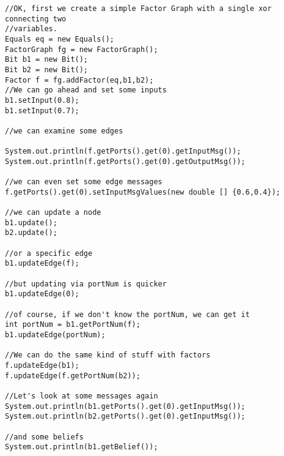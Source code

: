 \ifjava
\begin{lstlisting}
//OK, first we create a simple Factor Graph with a single xor connecting two  
//variables.
Equals eq = new Equals();
FactorGraph fg = new FactorGraph(); 
Bit b1 = new Bit();
Bit b2 = new Bit();
Factor f = fg.addFactor(eq,b1,b2);
//We can go ahead and set some inputs
b1.setInput(0.8);
b1.setInput(0.7);

//we can examine some edges

System.out.println(f.getPorts().get(0).getInputMsg());
System.out.println(f.getPorts().get(0).getOutputMsg());

//we can even set some edge messages
f.getPorts().get(0).setInputMsgValues(new double [] {0.6,0.4});

//we can update a node
b1.update();
b2.update();

//or a specific edge		
b1.updateEdge(f);
 
//but updating via portNum is quicker
b1.updateEdge(0);

//of course, if we don't know the portNum, we can get it
int portNum = b1.getPortNum(f);
b1.updateEdge(portNum);

//We can do the same kind of stuff with factors
f.updateEdge(b1);
f.updateEdge(f.getPortNum(b2));

//Let's look at some messages again
System.out.println(b1.getPorts().get(0).getInputMsg());
System.out.println(b2.getPorts().get(0).getInputMsg());

//and some beliefs
System.out.println(b1.getBelief());
\end{lstlisting}
\fi
